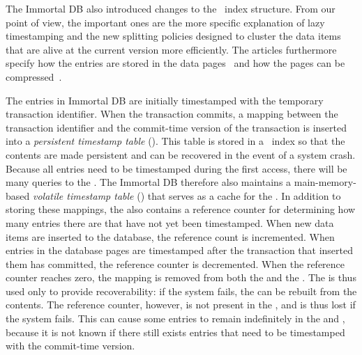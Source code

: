 The Immortal DB also introduced changes to the \TSBtree\ index structure.
From our point of view, the important ones are the more specific explanation
of lazy timestamping and the new splitting policies designed to cluster the
data items that are alive at the current version more efficiently.
The articles furthermore specify how the entries are stored in
the data
pages~\cite{lomet:2006:transactiontime,lomet:2008:version-compression} and
how the pages can be compressed~\cite{lomet:2008:version-compression}.

The entries in Immortal DB are initially timestamped with the
temporary transaction identifier.
When the transaction commits, a mapping between the transaction identifier and
the commit-time version of the transaction is inserted into a \emph{persistent
timestamp table} ()\label{def:ptt}\@.
This table is stored in a \Btree\ index so that the contents are made
persistent and can be recovered in the event of a system crash.
Because all entries need to be timestamped during the first access, there
will be many queries to the \@.
The Immortal DB therefore also maintains a main-memory-based \emph{volatile
timestamp table} ()\label{def:vtt} that serves as a
cache for the \@.
In addition to storing these mappings, the  also contains a
reference counter for determining how many entries there are that have
not yet been timestamped.
When new data items are inserted to the database, the reference count is
incremented.
When entries in the database pages are timestamped after the transaction that
inserted them has committed, the reference counter is decremented.
When the reference counter reaches zero, the mapping is removed from both
the  and the \@.
The  is thus used only to provide recoverability: if the system
fails, the  can be rebuilt from the  contents.
The reference counter, however, is not present in the , and 
is thus lost if the system fails.
This can cause some entries to remain indefinitely in the  and
, because it is not known if there still exists entries that 
need to be timestamped with the commit-time version.

